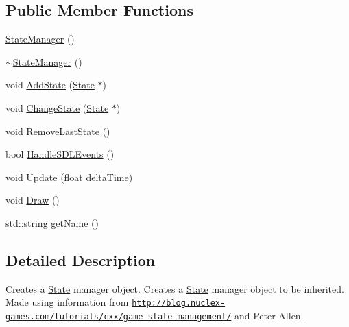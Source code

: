 \subsection*{Public Member Functions}
\begin{DoxyCompactItemize}
\item 
\hyperlink{class_state_manager_a3e2be96d935eb56813b096a885d58587}{State\+Manager} ()
\item 
\hyperlink{class_state_manager_a05a43504a033f1befad5c5118249ec6f}{$\sim$\+State\+Manager} ()
\item 
void \hyperlink{class_state_manager_aa925e9a15bba3cc4b262a08c8024ea3b}{Add\+State} (\hyperlink{class_state}{State} $\ast$)
\item 
void \hyperlink{class_state_manager_a8c14290973150a37afdf365d00ffcbba}{Change\+State} (\hyperlink{class_state}{State} $\ast$)
\item 
void \hyperlink{class_state_manager_ac782f24f5c02c27169bc2b3bf7aa3d41}{Remove\+Last\+State} ()
\item 
bool \hyperlink{class_state_manager_a10042662c52179ea1ad85051562ca4bf}{Handle\+S\+D\+L\+Events} ()
\item 
void \hyperlink{class_state_manager_a0b430dbaff295c0f96d365da8113fd31}{Update} (float delta\+Time)
\item 
void \hyperlink{class_state_manager_a2827f9e10336c53c7957ed5c09cb2a49}{Draw} ()
\item 
std\+::string \hyperlink{class_state_manager_afc67a8f9404b7c92237a654630eb7516}{get\+Name} ()
\end{DoxyCompactItemize}


\subsection{Detailed Description}
Creates a \hyperlink{class_state}{State} manager object. Creates a \hyperlink{class_state}{State} manager object to be inherited. Made using information from \href{http://blog.nuclex-games.com/tutorials/cxx/game-state-management/}{\tt http\+://blog.\+nuclex-\/games.\+com/tutorials/cxx/game-\/state-\/management/} and Peter Allen. 

